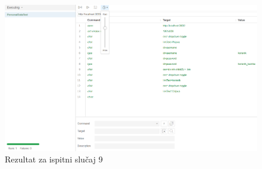 				\begin{figure}[H]
            					\includegraphics[width=\linewidth]{slike/selenium/PersonalDataTest.png}
            					\centering
            					\caption{Rezultat za ispitni slučaj 9}
            					\label{fig:test 9}
            		            \end{figure}
			\clearpage

